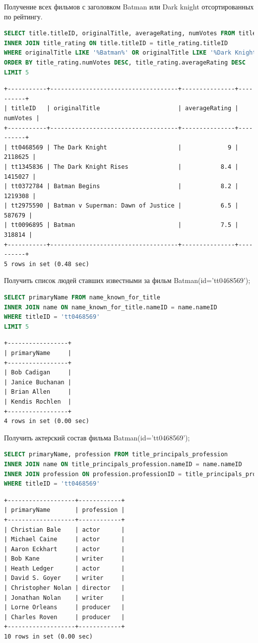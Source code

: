 \documentclass[12pt,a4paper]{article}
\begin{document}
Получение всех фильмов с заголовком Batman или Dark knight отсортированных по рейтингу.
\begin{lstlisting}[language=SQL]
SELECT title.titleID, originalTitle, averageRating, numVotes FROM title
INNER JOIN title_rating ON title.titleID = title_rating.titleID
WHERE originalTitle LIKE '%Batman%' OR originalTitle LIKE '%Dark Knight%' AND titleType = 'movie'
ORDER BY title_rating.numVotes DESC, title_rating.averageRating DESC
LIMIT 5
\end{lstlisting}
\begin{lstlisting}[basicstyle = \tiny\ttfamily, columns = fixed]
+-----------+------------------------------------+---------------+----------+
| titleID   | originalTitle                      | averageRating | numVotes |
+-----------+------------------------------------+---------------+----------+
| tt0468569 | The Dark Knight                    |             9 |  2118625 |
| tt1345836 | The Dark Knight Rises              |           8.4 |  1415027 |
| tt0372784 | Batman Begins                      |           8.2 |  1219308 |
| tt2975590 | Batman v Superman: Dawn of Justice |           6.5 |   587679 |
| tt0096895 | Batman                             |           7.5 |   318814 |
+-----------+------------------------------------+---------------+----------+
5 rows in set (0.48 sec)
\end{lstlisting}
Получить список людей ставших известными за фильм Batman(id='tt0468569');
\begin{lstlisting}[language=SQL]
SELECT primaryName FROM name_known_for_title 
INNER JOIN name ON name_known_for_title.nameID = name.nameID
WHERE titleID = 'tt0468569'
LIMIT 5
\end{lstlisting}
\begin{lstlisting}[basicstyle = \tiny\ttfamily, columns = fixed]
+-----------------+
| primaryName     |
+-----------------+
| Bob Cadigan     |
| Janice Buchanan |
| Brian Allen     |
| Kendis Rochlen  |
+-----------------+
4 rows in set (0.00 sec)
\end{lstlisting}
Получить актерский состав фильма Batman(id='tt0468569');
\begin{lstlisting}[language=SQL]
SELECT primaryName, profession FROM title_principals_profession
INNER JOIN name ON title_principals_profession.nameID = name.nameID
INNER JOIN profession ON profession.professionID = title_principals_profession.professionID
WHERE titleID = 'tt0468569'
\end{lstlisting}
\begin{lstlisting}[basicstyle = \tiny\ttfamily, columns = fixed]
+-------------------+------------+
| primaryName       | profession |
+-------------------+------------+
| Christian Bale    | actor      |
| Michael Caine     | actor      |
| Aaron Eckhart     | actor      |
| Bob Kane          | writer     |
| Heath Ledger      | actor      |
| David S. Goyer    | writer     |
| Christopher Nolan | director   |
| Jonathan Nolan    | writer     |
| Lorne Orleans     | producer   |
| Charles Roven     | producer   |
+-------------------+------------+
10 rows in set (0.00 sec)
\end{lstlisting}
\end{document}
